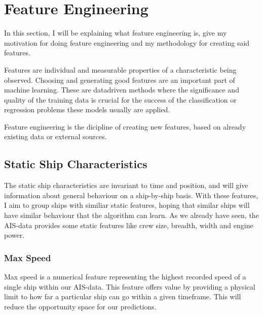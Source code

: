 \chapter[Feature Engineering]{Feature Engineering}
\label{chp:labelkey}
\begin{info}
\end{info}

In this section, I will be explaining what feature engineering is, give my motivation for doing feature engineering and my methodology for creating said features. 

Features are individual and measurable properties of a characteristic being observed. Choosing and generating good features are an important part of machine learning. These are datadriven methods where the significance and quality of the training data is crucial for the success of the classification or regression problems these models usually are applied. 

Feature engineering is the dicipline of creating new features, based on already existing data or external sources. 
\section{Static Ship Characteristics}
\begin{info}{}
\end{info}

The static ship characteristics are invariant to time and position, and will give information about general behaviour on a ship-by-ship basis. With these features, I aim to group ships with similiar static features, hoping that similar ships will have similar behaviour that the algorithm can learn. As we already have seen, the AIS-data provides some static features like crew size, breadth, width and engine power.

\subsection{Max Speed}
Max speed is a numerical feature representing the highest recorded speed of a single ship within our AIS-data. This feature offers value by providing a physical limit to how far a particular ship can go within a given timeframe. This will reduce the opportunity space for our predictions.

